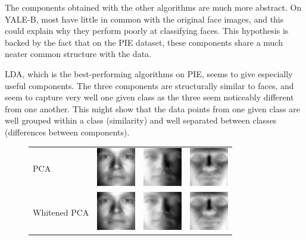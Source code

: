 \documentclass[10pt, a4paper]{article}
\begin{document}
The components obtained with the other algorithms are much more abstract. On YALE-B, most have little in common with the original face images, and this could explain why they perform poorly at classifying faces. This hypothesis is backed by the fact that on the PIE dataset, these components share a much neater common structure with the data.

LDA, which is the best-performing algorithms on PIE, seems to give especially useful components. The three components are structurally similar to faces, and seem to capture very well one given class as the three seem noticeably different from one another. This might show that the data points from one given class are well grouped within a class (similarity) and well separated between classes (differences between components).

\begin{figure}[h!]
\centering
\begin{tabular}{lccc}
PCA & \includegraphics{yale/yale_pca1} & \includegraphics{yale/yale_pca2} & \includegraphics{yale/yale_pca3} \\
Whitened PCA & \includegraphics{yale/yale_pca_white1} & \includegraphics{yale/yale_pca_white2} & \includegraphics{yale/yale_pca_white3} \\

\end{tabular}
\end{figure}
\end{document}
